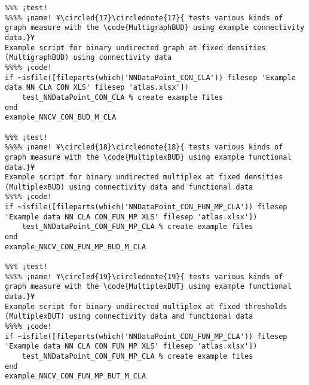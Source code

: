 \documentclass{tufte-handout}
\begin{document}
\begin{lstlisting}
%%% ¡test!
%%%% ¡name! ¥\circled{17}\circlednote{17}{ tests various kinds of graph measure with the \code{MultigraphBUD} using example connectivity data.}¥
Example script for binary undirected graph at fixed densities (MultigraphBUD) using connectivity data
%%%% ¡code!
if ~isfile([fileparts(which('NNDataPoint_CON_CLA')) filesep 'Example data NN CLA CON XLS' filesep 'atlas.xlsx'])
    test_NNDataPoint_CON_CLA % create example files
end
example_NNCV_CON_BUD_M_CLA

%%% ¡test!
%%%% ¡name! ¥\circled{18}\circlednote{18}{ tests various kinds of graph measure with the \code{MultiplexBUD} using example functional data.}¥
Example script for binary undirected multiplex at fixed densities (MultiplexBUD) using connectivity data and functional data
%%%% ¡code!
if ~isfile([fileparts(which('NNDataPoint_CON_FUN_MP_CLA')) filesep 'Example data NN CLA CON_FUN_MP XLS' filesep 'atlas.xlsx'])
    test_NNDataPoint_CON_FUN_MP_CLA % create example files
end
example_NNCV_CON_FUN_MP_BUD_M_CLA

%%% ¡test!
%%%% ¡name! ¥\circled{19}\circlednote{19}{ tests various kinds of graph measure with the \code{MultiplexBUT} using example functional data.}¥
Example script for binary undirected multiplex at fixed thresholds (MultiplexBUT) using connectivity data and functional data
%%%% ¡code!
if ~isfile([fileparts(which('NNDataPoint_CON_FUN_MP_CLA')) filesep 'Example data NN CLA CON_FUN_MP XLS' filesep 'atlas.xlsx'])
    test_NNDataPoint_CON_FUN_MP_CLA % create example files
end
example_NNCV_CON_FUN_MP_BUT_M_CLA

\end{lstlisting}

%
%
\end{document}
